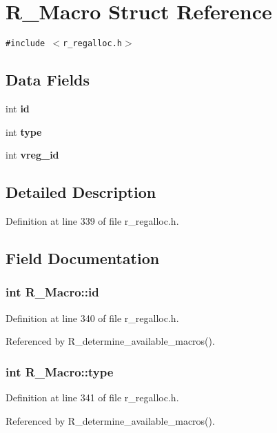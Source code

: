 \section{R\_\-Macro Struct Reference}
\label{structR__Macro}
{\tt \#include $<$r\_\-regalloc.h$>$}

\subsection*{Data Fields}
\begin{CompactItemize}
\item 
int \bf{id}
\item 
int \bf{type}
\item 
int \bf{vreg\_\-id}
\end{CompactItemize}


\subsection{Detailed Description}




Definition at line 339 of file r\_\-regalloc.h.

\subsection{Field Documentation}
\subsubsection{\setlength{\rightskip}{0pt plus 5cm}int \bf{R\_\-Macro::id}}\label{structR__Macro_e12e7573c52b9baf89dfde49f802a2b6}




Definition at line 340 of file r\_\-regalloc.h.

Referenced by R\_\-determine\_\-available\_\-macros().
\subsubsection{\setlength{\rightskip}{0pt plus 5cm}int \bf{R\_\-Macro::type}}\label{structR__Macro_5514b2d978d7d0e34380a59fa5b71745}




Definition at line 341 of file r\_\-regalloc.h.

Referenced by R\_\-determine\_\-available\_\-macros().

